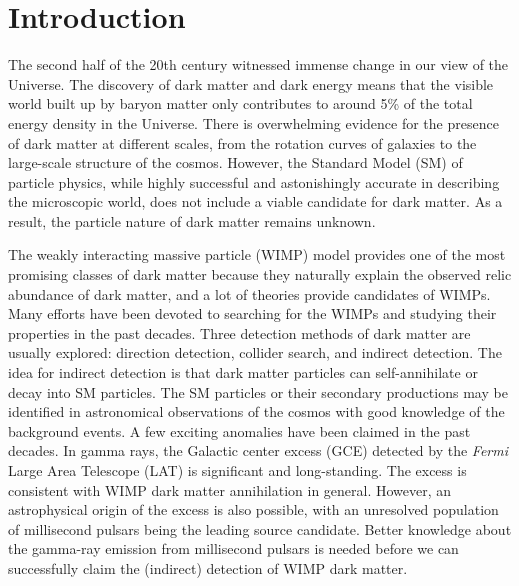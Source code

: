 \documentclass[doublespace,nopageskip]{VTthesis} %
\begin{document}



\mainmatter

\chapter{Introduction} \label{ch:introduction}

The second half of the 20th century witnessed immense change in our view of the Universe. The discovery of dark matter and dark energy means that the visible world built up by baryon matter only contributes to around 5\% of the total energy density in the Universe. There is overwhelming evidence for the presence of dark matter at different scales, from the rotation curves of galaxies to the large-scale structure of the cosmos. However, the Standard Model (SM) of particle physics, while highly successful and astonishingly accurate in describing the microscopic world, does not include a viable candidate for dark matter. As a result, the particle nature of dark matter remains unknown. 

The weakly interacting massive particle (WIMP) model provides one of the most promising classes of dark matter because they naturally explain the observed relic abundance of dark matter, and a lot of theories provide candidates of WIMPs. Many efforts have been devoted to searching for the WIMPs and studying their properties in the past decades. Three detection methods of dark matter are usually explored: direction detection, collider search, and indirect detection. The idea for indirect detection is that dark matter particles can self-annihilate or decay into SM particles. The SM particles or their secondary productions may be identified in astronomical observations of the cosmos with good knowledge of the background events. A few exciting anomalies have been claimed in the past decades. In gamma rays, the Galactic center excess (GCE) detected by the \textit{Fermi} Large Area Telescope (LAT) is significant and long-standing. The excess is consistent with WIMP dark matter annihilation in general. However, an astrophysical origin of the excess is also possible, with an unresolved population of millisecond pulsars being the leading source candidate. Better knowledge about the gamma-ray emission from millisecond pulsars is needed before we can successfully claim the (indirect) detection of WIMP dark matter.
\end{document}
